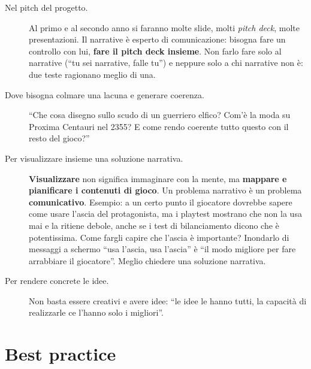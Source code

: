 \begin{description}
  \item[Nel pitch del progetto.] Al primo e al secondo anno si faranno molte
        slide, molti \emph{pitch deck}, molte presentazioni. Il narrative è
        esperto di comunicazione: bisogna fare un controllo con lui,
        \textbf{fare il pitch deck insieme}. Non farlo fare solo al narrative
        (``tu sei narrative, falle tu'') e neppure solo a chi narrative non
        è: due teste ragionano meglio di una.
  \item[Dove bisogna colmare una lacuna e generare coerenza.] ``Che cosa
        disegno sullo scudo di un guerriero elfico? Com'è la moda su Proxima
        Centauri nel 2355? E come rendo coerente tutto questo con il resto del
        gioco?''
  \item[Per visualizzare insieme una soluzione narrativa.]
        \textbf{Visualizzare} non significa immaginare con la mente, ma
        \textbf{mappare e pianificare i contenuti di gioco}. Un problema
        narrativo è un problema \textbf{comunicativo}. Esempio: a un certo
        punto il giocatore dovrebbe sapere come usare l'ascia del
        protagonista, ma i playtest mostrano che non la usa mai e la ritiene
        debole, anche se i test di bilanciamento dicono che è potentissima.
        Come fargli capire che l'ascia è importante? Inondarlo di messaggi a
        schermo ``usa l'ascia, usa l'ascia'' è ``il modo migliore per fare
        arrabbiare il giocatore''. Meglio chiedere una soluzione narrativa.
  \item[Per rendere concrete le idee.] Non basta essere creativi e avere
        idee: ``le idee le hanno tutti, la capacità di realizzarle ce l'hanno
        solo i migliori''.
\end{description}

\section{Best practice}
\label{p3:sec:best}

